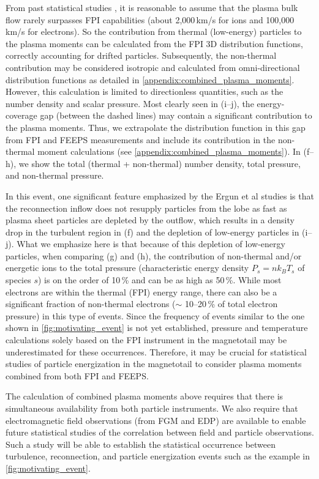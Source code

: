 \documentclass[draft]{agujournal2019}
\begin{document}
From past statistical studies \cite{Huang2020,Chong2022}, it is reasonable to assume that the plasma bulk flow rarely surpasses FPI capabilities (about 2,000\,\si{km/s} for ions and 100,000\,\si{km/s} for electrons). So the contribution from thermal (low-energy) particles to the plasma moments can be calculated from the FPI 3D distribution functions, correctly accounting for drifted particles. Subsequently, the non-thermal contribution may be considered isotropic and calculated from omni-directional distribution functions as detailed in \ref{appendix:combined_plasma_moments}. However, this calculation is limited to directionless quantities, such as the number density and scalar pressure. Most clearly seen in (i--j), the energy-coverage gap (between the dashed lines) may contain a significant contribution to the plasma moments. Thus, we extrapolate the distribution function in this gap from FPI and FEEPS measurements and include its contribution in the non-thermal moment calculations (see \ref{appendix:combined_plasma_moments}). In (f--h), we show the total (thermal + non-thermal) number density, total pressure, and non-thermal pressure.

In this event, one significant feature emphasized by the Ergun et al studies is that the reconnection inflow does not resupply particles from the lobe as fast as plasma sheet particles are depleted by the outflow, which results in a density drop in the turbulent region in (f) and the depletion of low-energy particles in (i--j). What we emphasize here is that because of this depletion of low-energy particles, when comparing (g) and (h), the contribution of non-thermal and/or energetic ions to the total pressure (characteristic energy density ${P_s=nk_BT_s}$ of species $s$) is on the order of 10\,\% and can be as high as 50\,\%. While most electrons are within the thermal (FPI) energy range, there can also be a significant fraction of non-thermal electrons ($\sim$ 10--20\,\% of total electron pressure) in this type of events. Since the frequency of events similar to the one shown in \cref{fig:motivating_event} is not yet established, pressure and temperature calculations solely based on the FPI instrument in the magnetotail may be underestimated for these occurrences. Therefore, it may be crucial for statistical studies of particle energization in the magnetotail to consider plasma moments combined from both FPI and FEEPS.

The calculation of combined plasma moments above requires that there is simultaneous availability from both particle instruments. We also require that electromagnetic field observations (from FGM and EDP) are available to enable future statistical studies of the correlation between field and particle observations. Such a study will be able to establish the statistical occurrence between turbulence, reconnection, and particle energization events such as the example in \cref{fig:motivating_event}.
\end{document}

